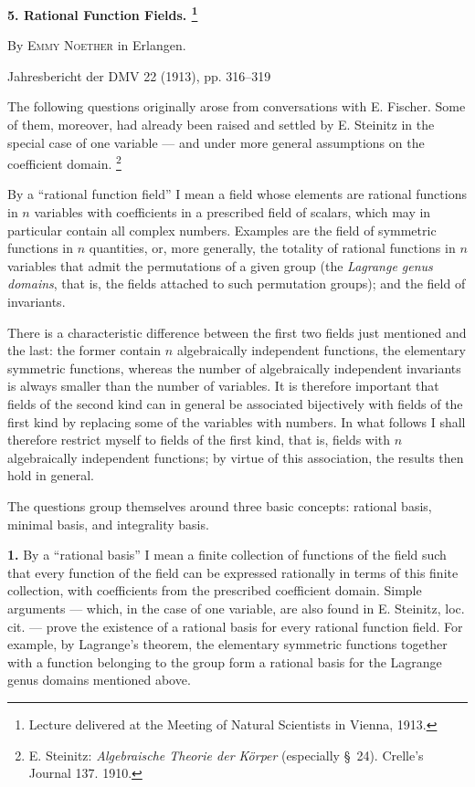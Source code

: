 \documentclass[11pt]{article}
\newcommand{\NoetherSrcNote}[2]{%
  \begingroup
  \renewcommand{\thefootnote}{[#1]}%
  \footnote{#2}%
  \endgroup
}
\begin{document}
\begin{center}
{\Large\bfseries 5. Rational Function Fields.\NoetherSrcNote{316:1}{Lecture delivered at the Meeting of Natural Scientists in Vienna, 1913.}}\par
\vspace{1.2em}
By \textsc{Emmy Noether} in Erlangen.\par
\medskip
Jahresbericht der DMV 22 (1913), pp. 316--319
\end{center}

\vspace{2em}

The following questions originally arose from conversations with E. Fischer. Some of them, moreover, had already been raised and settled by E. Steinitz in the special case of one variable --- and under more general assumptions on the coefficient domain.\NoetherSrcNote{316:2}{E. Steinitz: \emph{Algebraische Theorie der Körper} (especially \S\ 24). Crelle's Journal 137. 1910.}

By a “rational function field” I mean a field whose elements are rational functions in $n$ variables with coefficients in a prescribed field of scalars, which may in particular contain all complex numbers. Examples are the field of symmetric functions in $n$ quantities, or, more generally, the totality of rational functions in $n$ variables that admit the permutations of a given group (the \emph{Lagrange genus domains}, that is, the fields attached to such permutation groups); and the field of invariants.

There is a characteristic difference between the first two fields just mentioned and the last: the former contain $n$ algebraically independent functions, the elementary symmetric functions, whereas the number of algebraically independent invariants is always smaller than the number of variables. It is therefore important that fields of the second kind can in general be associated bijectively with fields of the first kind by replacing some of the variables with numbers. In what follows I shall therefore restrict myself to fields of the first kind, that is, fields with $n$ algebraically independent functions; by virtue of this association, the results then hold in general.

The questions group themselves around three basic concepts: rational basis, minimal basis, and integrality basis.

\textbf{1.} By a “rational basis” I mean a finite collection of functions of the field such that every function of the field can be expressed rationally in terms of this finite collection, with coefficients from the prescribed coefficient domain. Simple arguments --- which, in the case of one variable, are also found in E. Steinitz, loc. cit. --- prove the existence of a rational basis for every rational function field. For example, by Lagrange's theorem, the elementary symmetric functions together with a function belonging to the group form a rational basis for the Lagrange genus domains mentioned above.
\end{document}
